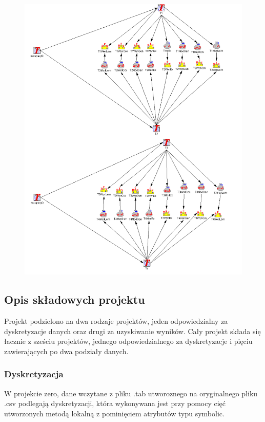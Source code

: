 \documentclass[12pt,oneside,a4paper]{book} %
\theoremstyle{break}
\begin{document}
\begin{figure}[H]
  \centering
  \includegraphics[width=1\textwidth]{project1.png}
\end{figure}

\subsection*{Opis składowych projektu}

Projekt podzielono na dwa rodzaje projektów, jeden odpowiedzialny za dyskretyzacje danych oraz drugi za uzyskiwanie wyników.
Cały projekt składa się łacznie z sześciu projektów, jednego odpowiedzialnego za dyskretyzacje i pięciu zawierających po dwa podziały danych.

\subsubsection*{Dyskretyzacja}

W projekcie zero, dane wczytane z pliku .tab utworoznego na oryginalnego pliku .csv podlegają dyskretyzacji, która wykonywana jest przy pomocy cięć utworzonych metodą lokalną z pominięciem atrybutów typu symbolic.
\end{document}
